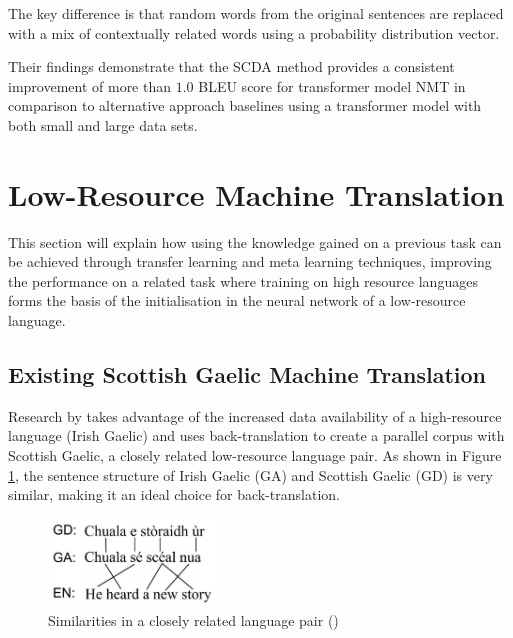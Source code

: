 The key difference is that random words from the original sentences are replaced with a mix of contextually related words using a probability distribution vector.




Their findings demonstrate that the \acrshort{SCDA} method provides a consistent improvement of more than $1.0$ BLEU score for transformer model \acrshort{NMT} in comparison to alternative approach baselines using a transformer model with both small and large data sets.


\section{Low-Resource Machine Translation}
\label{sec:2-low_resource_approaches}
This section will explain how using the knowledge gained on a previous task can be achieved through transfer learning and meta learning techniques, improving the performance on a related task where training on high resource languages forms the basis of the initialisation in the neural network of a low-resource language.

\subsection{Existing Scottish Gaelic Machine Translation}

Research by \cite{dowling_leveraging_2019} takes advantage of the increased data availability of a high-resource language (Irish Gaelic) and uses back-translation to create a parallel corpus with Scottish Gaelic, a closely related low-resource language pair. As shown in Figure \ref{fig:lang_pair}, the sentence structure of Irish Gaelic (GA) and Scottish Gaelic (GD) is very similar, making it an ideal choice for back-translation.

\begin{figure}[ht!]
\centering
\includegraphics[width=0.4\textwidth]{media/literature/nmt_approaches/lr_gaelic.png}
\caption[Diagram of the similarities in a closely related language pair]{Similarities in a closely related language pair (\cite{dowling_leveraging_2019})}
\label{fig:lang_pair}
\end{figure}


